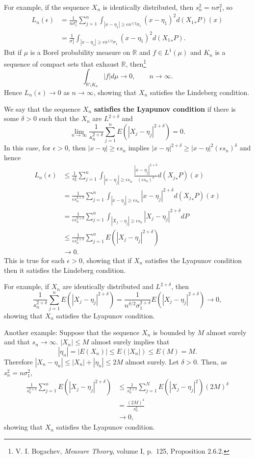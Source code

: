 \documentclass{article}
\theoremstyle{definition}
\begin{document}
For example, if the sequence $X_n$ is identically distributed, then
$s_n^2=n\sigma_1^2$, so
\begin{align*}
L_n(\epsilon) &= \frac{1}{n\sigma_1^2} \sum_{j=1}^n \int_{|x-\eta_1| \geq \epsilon n^{1/2} \sigma_1} (x-\eta_1)^2 d({X_1}_*P)(x)\\
&=\frac{1}{\sigma_1^2} \int_{|x-\eta_1| \geq \epsilon n^{1/2} \sigma_1} (x-\eta_1)^2 d({X_1}_*P).
\end{align*}
But if $\mu$ is a Borel probability measure on $\mathbb{R}$ and $f \in L^1(\mu)$ and $K_n$ is a sequence
of compact sets that exhaust $\mathbb{R}$, then\footnote{V. I. Bogachev, {\em Measure Theory}, volume I,
p.~125, Proposition 2.6.2.}
\[
\int_{\mathbb{R} \setminus K_n} |f| d\mu \to 0, \qquad n \to \infty.
\]
Hence $L_n(\epsilon) \to 0$ as $n \to \infty$, showing that $X_n$ satisfies the Lindeberg condition. 

We say that the sequence $X_n$ \textbf{satisfies the Lyapunov condition} if there is some $\delta>0$ such that the $X_n$ are $L^{2+\delta}$ and
\[
\lim_{n \to \infty} \frac{1}{s_n^{2+\delta}} \sum_{j=1}^n E(|X_j-\eta_j|^{2+\delta})=0.
\]
In this case, for $\epsilon>0$, then $|x-\eta| \geq \epsilon s_n$ implies
$|x-\eta|^{2+\delta} \geq |x-\eta|^2 (\epsilon s_n)^\delta$ and hence
\begin{align*}
L_n(\epsilon)&\leq \frac{1}{s_n^2} \sum_{j=1}^n \int_{|x-\eta_j| \geq \epsilon s_n} \frac{|x-\eta_j|^{2+\delta}}{(\epsilon s_n)^\delta} d({X_j}_*P)(x)\\
&=\frac{1}{\epsilon  s_n^{2+\delta}} \sum_{j=1}^n \int_{|x-\eta_j| \geq \epsilon s_n} |x-\eta_j|^{2+\delta} d({X_j}_*P)(x)\\
&=\frac{1}{\epsilon s_n^{2+\delta}} \sum_{j=1}^n \int_{|X_j-\eta_j| \geq \epsilon s_n} |X_j-\eta_j|^{2+\delta} dP\\
&\leq \frac{1}{\epsilon s_n^{2+\delta}} \sum_{j=1}^n E(|X_j-\eta_j|^{2+\delta})\\
&\to 0.
\end{align*}
This is true for each $\epsilon>0$, showing that if $X_n$ satisfies the Lyapunov condition then it satisfies the Lindeberg
condition.

For example, if
$X_n$ are identically distributed and $L^{2+\delta}$, then 
\[
\frac{1}{s_n^{2+\delta}} \sum_{j=1}^n E(|X_j-\eta_j|^{2+\delta}) = 
\frac{1}{n^{\delta/2} \sigma_1^{2+\delta}} E(|X_j-\eta_j|^{2+\delta}) \to 0,
\]
showing that $X_n$ satisfies the Lyapunov condition. 


Another example: Suppose that the sequence $X_n$ is bounded by $M$ almost surely and that $s_n \to \infty$.
$|X_n| \leq M$ almost surely implies that
\[
|\eta_n| = |E(X_n)| \leq E(|X_n|) \leq E(M) = M.
\]
Therefore $|X_n-\eta_n| \leq |X_n|+|\eta_n| \leq 2M$ almost surely. 
Let $\delta>0$. Then, as $s_n^2=n \sigma_1^2$,
\begin{align*}
\frac{1}{s_n^{2+\delta}} \sum_{j=1}^n E(|X_j-\eta_j|^{2+\delta})&\leq 
\frac{1}{s_n^{2+\delta}} \sum_{j=1}^N E(|X_j-\eta_j|^2) (2M)^{\delta}\\
&=\frac{(2M)^\delta}{s_n^{\delta}}\\
&\to 0,
\end{align*}
showing that $X_n$ satisfies the Lyapunov condition. 
\end{document}
